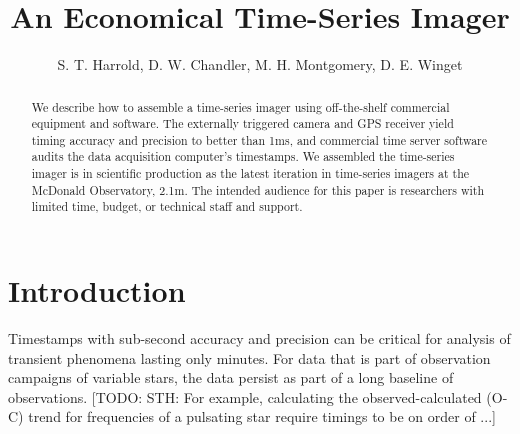 \documentclass[preprint2]{aastex}
\begin{document}
\title{An Economical Time-Series Imager}

\author{
    S. T. Harrold,
    D. W. Chandler,
    M. H. Montgomery,
    D. E. Winget}


\begin{abstract}

We describe how to assemble a time-series imager using off-the-shelf commercial equipment and software. The externally triggered camera and GPS receiver yield timing accuracy and precision to better than 1ms, and commercial time server software audits the data acquisition computer's timestamps. We assembled the time-series imager is in scientific production as the latest iteration in time-series imagers at the McDonald Observatory, 2.1m. The intended audience for this paper is researchers with limited time, budget, or technical staff and support.

\end{abstract}



\section{Introduction}


Timestamps with sub-second accuracy and precision can be critical for analysis of transient phenomena lasting only minutes. For data that is part of observation campaigns of variable stars, the data persist as part of a long baseline of observations. [TODO: STH: For example, calculating the observed-calculated (O-C) trend for frequencies of a pulsating star require timings to be on order of ...]
\end{document}
